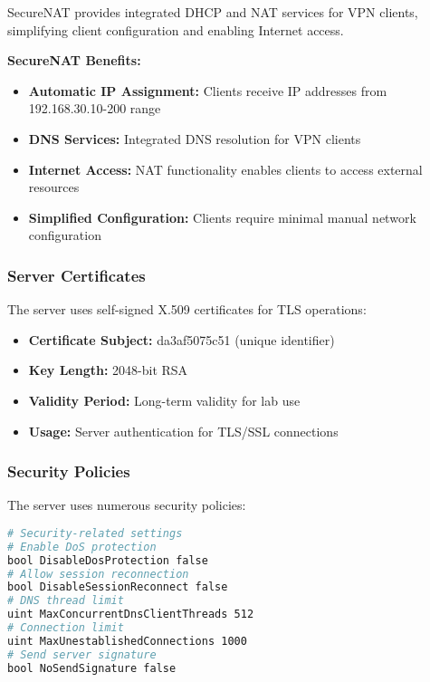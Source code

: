 SecureNAT provides integrated DHCP and NAT services for VPN clients, simplifying client configuration and enabling Internet access.

\textbf{SecureNAT Benefits:}

\begin{itemize}
    \item \textbf{Automatic IP Assignment:} Clients receive IP addresses from 192.168.30.10-200 range
    \item \textbf{DNS Services:} Integrated DNS resolution for VPN clients
    \item \textbf{Internet Access:} NAT functionality enables clients to access external resources
    \item \textbf{Simplified Configuration:} Clients require minimal manual network configuration
\end{itemize}

\subsubsection{Server Certificates}

The server uses self-signed X.509 certificates for TLS operations:

\begin{itemize}
    \item \textbf{Certificate Subject:} da3af5075c51 (unique identifier)
    \item \textbf{Key Length:} 2048-bit RSA
    \item \textbf{Validity Period:} Long-term validity for lab use
    \item \textbf{Usage:} Server authentication for TLS/SSL connections
\end{itemize}

\subsubsection{Security Policies}

The server uses numerous security policies:

\begin{lstlisting}[language=bash]
# Security-related settings
# Enable DoS protection
bool DisableDosProtection false                     
# Allow session reconnection
bool DisableSessionReconnect false               
# DNS thread limit 
uint MaxConcurrentDnsClientThreads 512           
# Connection limit
uint MaxUnestablishedConnections 1000            
# Send server signature
bool NoSendSignature false                       
\end{lstlisting}

